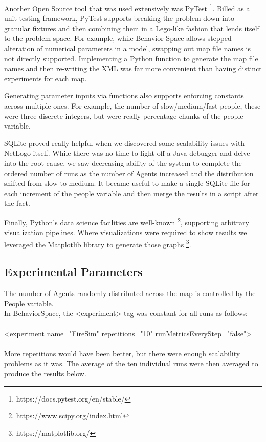\documentclass[12pt,letterpaper]{article}
\begin{document}
Another Open Source tool that was used extensively was PyTest \footnote{https://docs.pytest.org/en/stable/}. Billed as a
unit testing framework, PyTest supports breaking the problem down into granular
fixtures and then combining them in a Lego-like fashion that lends itself to the
problem space. For example, while Behavior Space allows stepped alteration of
numerical parameters in a model, swapping out map file names is not directly
supported. Implementing a Python function to generate the map file names and
then re-writing the XML was far more convenient than having distinct
experiments for each map.

Generating parameter inputs via functions also supports enforcing constants
across multiple ones. For example, the number of slow/medium/fast people, these
were three discrete integers, but were really percentage chunks of the people
variable.


SQLite proved really helpful when we discovered some scalability issues with
NetLogo itself. While there was no time to light off a Java debugger and delve
into the root cause, we saw decreasing ability of the system to complete the
ordered number of runs as the number of Agents increased and the distribution
shifted from slow to medium. It became useful to make a single SQLite file for
each increment of the people variable and then merge the results in a script
after the fact.

Finally, Python's data science facilities are well-known \footnote{https://www.scipy.org/index.html}, supporting arbitrary visualization pipelines.  Where visualizations were required to show results we leveraged the Matplotlib library to generate those graphs \footnote{ https://matplotlib.org/}.

\subsection{Experimental Parameters}
The number of Agents randomly distributed across the map is controlled by the
People variable. \\
In BehaviorSpace, the <experiment> tag was constant for all runs as follows:\\
\\
  <experiment name="FireSim" repetitions="10" runMetricsEveryStep="false">\\
\\
More repetitions would have been better, but there were enough scalability
problems as it was. The average of the ten individual runs were then averaged to
produce the results below.
\end{document}
